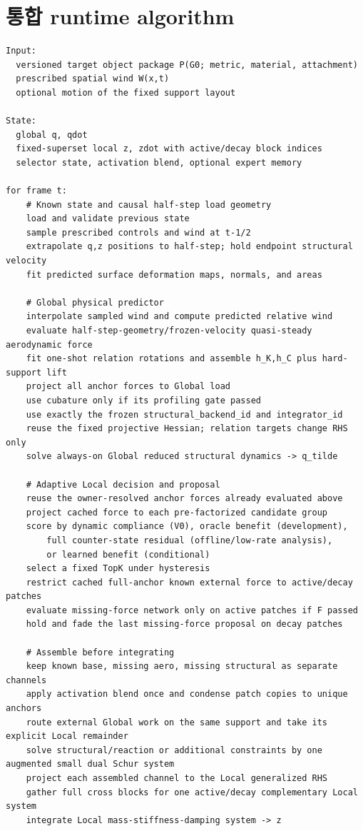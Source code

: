 \documentclass[11pt,a4paper]{article}
\begin{document}
\section{통합 runtime algorithm}

\begin{lstlisting}
Input:
  versioned target object package P(G0; metric, material, attachment)
  prescribed spatial wind W(x,t)
  optional motion of the fixed support layout

State:
  global q, qdot
  fixed-superset local z, zdot with active/decay block indices
  selector state, activation blend, optional expert memory

for frame t:
    # Known state and causal half-step load geometry
    load and validate previous state
    sample prescribed controls and wind at t-1/2
    extrapolate q,z positions to half-step; hold endpoint structural velocity
    fit predicted surface deformation maps, normals, and areas

    # Global physical predictor
    interpolate sampled wind and compute predicted relative wind
    evaluate half-step-geometry/frozen-velocity quasi-steady aerodynamic force
    fit one-shot relation rotations and assemble h_K,h_C plus hard-support lift
    project all anchor forces to Global load
    use cubature only if its profiling gate passed
    use exactly the frozen structural_backend_id and integrator_id
    reuse the fixed projective Hessian; relation targets change RHS only
    solve always-on Global reduced structural dynamics -> q_tilde

    # Adaptive Local decision and proposal
    reuse the owner-resolved anchor forces already evaluated above
    project cached force to each pre-factorized candidate group
    score by dynamic compliance (V0), oracle benefit (development),
        full counter-state residual (offline/low-rate analysis),
        or learned benefit (conditional)
    select a fixed TopK under hysteresis
    restrict cached full-anchor known external force to active/decay patches
    evaluate missing-force network only on active patches if F passed
    hold and fade the last missing-force proposal on decay patches

    # Assemble before integrating
    keep known base, missing aero, missing structural as separate channels
    apply activation blend once and condense patch copies to unique anchors
    route external Global work on the same support and take its explicit Local remainder
    solve structural/reaction or additional constraints by one augmented small dual Schur system
    project each assembled channel to the Local generalized RHS
    gather full cross blocks for one active/decay complementary Local system
    integrate Local mass-stiffness-damping system -> z


\end{lstlisting}
\end{document}
